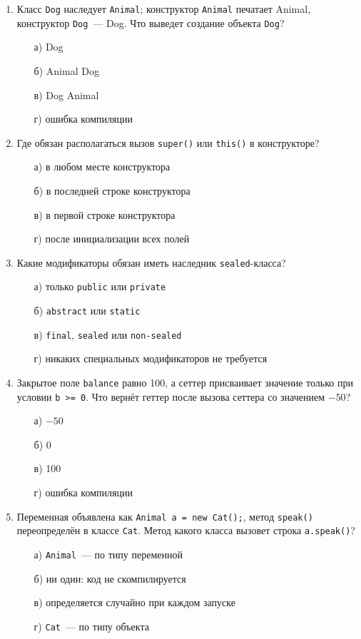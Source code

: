 \begin{enumerate}
\item Класс \texttt{Dog} наследует \texttt{Animal}; конструктор
      \texttt{Animal} печатает Animal, конструктор \texttt{Dog}~--- Dog. Что
      выведет создание объекта \texttt{Dog}?
  \begin{enumerate}
    \item[а)] Dog
    \item[б)] Animal Dog
    \item[в)] Dog Animal
    \item[г)] ошибка компиляции
  \end{enumerate}

\item Где обязан располагаться вызов \texttt{super()} или \texttt{this()} в
      конструкторе?
  \begin{enumerate}
    \item[а)] в любом месте конструктора
    \item[б)] в последней строке конструктора
    \item[в)] в первой строке конструктора
    \item[г)] после инициализации всех полей
  \end{enumerate}

\item Какие модификаторы обязан иметь наследник \texttt{sealed}-класса?
  \begin{enumerate}
    \item[а)] только \texttt{public} или \texttt{private}
    \item[б)] \texttt{abstract} или \texttt{static}
    \item[в)] \texttt{final}, \texttt{sealed} или \texttt{non-sealed}
    \item[г)] никаких специальных модификаторов не требуется
  \end{enumerate}

\item Закрытое поле \texttt{balance} равно 100, а сеттер присваивает значение
      только при условии \texttt{b >= 0}. Что вернёт геттер после вызова
      сеттера со значением $-50$?
  \begin{enumerate}
    \item[а)] $-50$
    \item[б)] 0
    \item[в)] 100
    \item[г)] ошибка компиляции
  \end{enumerate}

\item Переменная объявлена как \texttt{Animal a = new Cat();}, метод
      \texttt{speak()} переопределён в классе \texttt{Cat}. Метод какого класса
      вызовет строка \texttt{a.speak()}?
  \begin{enumerate}
    \item[а)] \texttt{Animal}~--- по типу переменной
    \item[б)] ни один: код не скомпилируется
    \item[в)] определяется случайно при каждом запуске
    \item[г)] \texttt{Cat}~--- по типу объекта
  \end{enumerate}


\end{enumerate}
